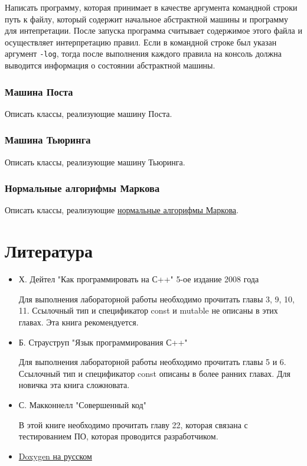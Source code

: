 \documentclass[a4paper,12pt]{article}
\begin{document}
Написать программу, которая принимает в качестве аргумента командной
строки путь к файлу, который содержит начальное абстрактной машины и
программу для интепретации. После запуска программа считывает
содержимое этого файла и осуществляет интерпретацию правил. Если в
командной строке был указан аргумент \verb|-log|, тогда после
выполнения каждого правила на консоль должна выводится информация о
состоянии абстрактной машины.

\subsubsection{Машина Поста}

Описать классы, реализующие машину Поста.

\subsubsection{Машина Тьюринга}

Описать классы, реализующие машину Тьюринга.

\subsubsection{Нормальные алгорифмы Маркова}

Описать классы, реализующие
\href{http://ru.wikipedia.org/wiki/%D0%9D%D0%BE%D1%80%D0%BC%D0%B0%D0%BB%D1%8C%D0%BD%D1%8B%D0%B9_%D0%B0%D0%BB%D0%B3%D0%BE%D1%80%D0%B8%D1%82%D0%BCe_%D0%9C%D0%B0%D1%80%D0%BA%D0%BE%D0%B2%D0%B0}{нормальные алгорифмы Маркова}.

\section{Литература}
\label{sec:Literature}

\begin{itemize}
\item Х. Дейтел "Как программировать на С++" 5-ое издание 2008 года

  Для выполнения лабораторной работы необходимо прочитать главы 3, 9,
  10, 11. Ссылочный тип и спецификатор const и mutable не описаны в
  этих главах. Эта книга рекомендуется.

\item Б. Страуструп "Язык программирования С++"

  Для выполнения лабораторной работы необходимо прочитать главы 5 и
  6. Ссылочный тип и спецификатор const описаны в более ранних
  главах. Для новичка эта книга сложновата.

\item С. Макконнелл "Совершенный код"

  В этой книге необходимо прочитать главу 22, которая связана с
  тестированием ПО, которая проводится разработчиком.

\item \href{http://doxygenorg.ru/old/}{Doxygen на русском}

\end{itemize}
\end{document}
